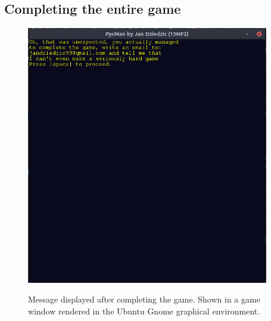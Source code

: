 \documentclass[11pt,a4paper,notitlepage]{report}
\newcommand{\dsubsection}[1]{\FloatBarrier \subsection{#1}}
\newenvironment{img}{
	\begin{center}
		\begin{figure}[H]
			\begin{center}
			
}{
	\end{center}
		\end{figure}
			\end{center}
}
\begin{document}
			\dsubsection{Completing the entire game}
				\begin{img}
					\includegraphics[width=300pt]{images/real_congrats_msg.png}\\
					\caption{Message displayed after completing the game. Shown in a game window rendered in the Ubuntu Gnome graphical environment.}
				\end{img}
\end{document}
